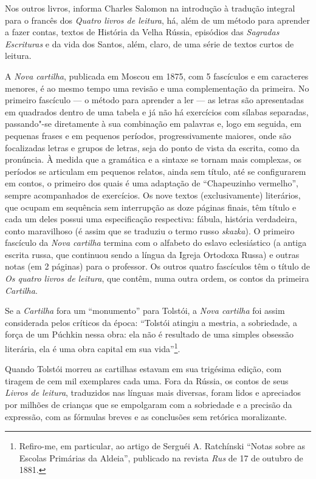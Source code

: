 {{Nos outros livros, informa Charles Salomon na introdução à
tradução integral para o francês dos \emph{Quatro livros de
leitura}, há, além de um método para aprender a fazer contas, textos de
História da Velha Rússia, episódios das \emph{Sagradas Escrituras} e da vida
dos Santos, além, claro, de uma série de textos curtos de leitura.

A \emph{Nova cartilha}, publicada em Moscou em 1875, com 5 fascículos e
em caracteres menores, é ao mesmo tempo uma revisão e uma complementação
da primeira. No primeiro fascículo --- o método para aprender a ler --- as
letras são apresentadas em quadrados dentro de uma tabela e já não há
exercícios com sílabas separadas, passando"-se diretamente à sua
combinação em palavras e, logo em seguida, em pequenas frases e em
pequenos períodos, progressivamente maiores, onde são focalizadas letras
e grupos de letras, seja do ponto de vista da escrita, como da
pronúncia. À medida que a gramática e a sintaxe se tornam mais
complexas, os períodos se articulam em pequenos relatos, ainda sem
título, até se configurarem em contos, o primeiro dos quais é uma
adaptação de ``Chapeuzinho vermelho'', sempre acompanhados de
exercícios. Os nove textos (exclusivamente) literários, que ocupam em
sequência sem interrupção as doze páginas finais, têm título e cada um
deles possui uma especificação respectiva: fábula, história verdadeira,
conto maravilhoso (é assim que se traduziu o termo
russo \emph{skazka}). O primeiro fascículo da \emph{Nova
cartilha} termina com o alfabeto do eslavo eclesiástico (a antiga
escrita russa, que continuou sendo a língua da Igreja Ortodoxa Russa) e
outras notas (em 2 páginas) para o professor. Os outros quatro
fascículos têm o título de \emph{Os quatro livros de leitura}, que
contêm, numa outra ordem, os contos da primeira \emph{Cartilha}.

Se a \emph{Cartilha} fora um ``monumento'' para Tolstói, a \emph{Nova
cartilha} foi assim considerada pelos críticos da época: ``Tolstói
atingiu a mestria, a sobriedade, a força de um Púchkin nessa obra: ela
não é resultado de uma simples obsessão literária, ela é uma obra
capital em sua vida''\footnote{Refiro-me, em particular, ao artigo
  de Serguéi A. Ratchínski ``Notas sobre as Escolas Primárias da
  Aldeia'', publicado na revista \emph{Rus} de 17 de outubro de 1881.}.

Quando Tolstói morreu as cartilhas estavam em sua trigésima edição, com
tiragem de cem mil exemplares cada uma. Fora da Rússia, os contos de
seus \emph{Livros de leitura}, traduzidos nas línguas mais diversas,
foram lidos e apreciados por milhões de crianças que se empolgaram com a
sobriedade e a precisão da expressão, com as fórmulas breves e as
conclusões sem retórica moralizante.

}}
